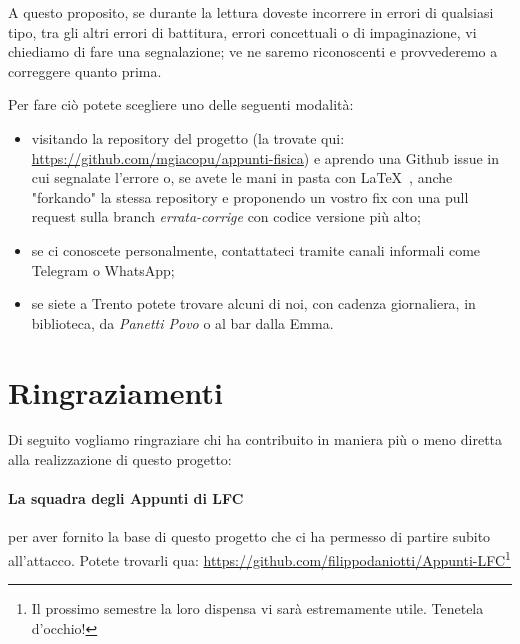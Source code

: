 \documentclass[class=book, crop=false, oneside, 12pt]{standalone}
\begin{document}
A questo proposito, se durante la lettura doveste incorrere in errori di qualsiasi tipo, tra gli altri errori di battitura, errori concettuali o di impaginazione, vi chiediamo di fare una segnalazione; ve ne saremo riconoscenti e provvederemo a correggere quanto prima.

Per fare ciò potete scegliere uno delle seguenti modalità:
\begin{itemize}
    \item visitando la repository del progetto (la trovate qui: \url{https://github.com/mgiacopu/appunti-fisica}) e aprendo una Github issue in cui segnalate l'errore o, se avete le mani in pasta con \LaTeX~, anche "forkando" la stessa repository e proponendo un vostro fix con una pull request sulla branch \emph{errata-corrige} con codice versione più alto;
    \item se ci conoscete personalmente, contattateci tramite canali informali come Telegram o WhatsApp;
    \item se siete a Trento potete trovare alcuni di noi, con cadenza giornaliera, in biblioteca, da \emph{Panetti Povo\texttrademark} o al bar dalla Emma.
\end{itemize}

\section*{Ringraziamenti}
Di seguito vogliamo ringraziare chi ha contribuito in maniera più o meno diretta alla realizzazione di questo progetto:

\paragraph{La squadra degli Appunti di LFC} per aver fornito la base di questo progetto che ci ha permesso di partire subito all'attacco. Potete trovarli qua: \url{https://github.com/filippodaniotti/Appunti-LFC}\footnote{Il prossimo semestre la loro dispensa vi sarà estremamente utile. Tenetela d'occhio!}
\end{document}
